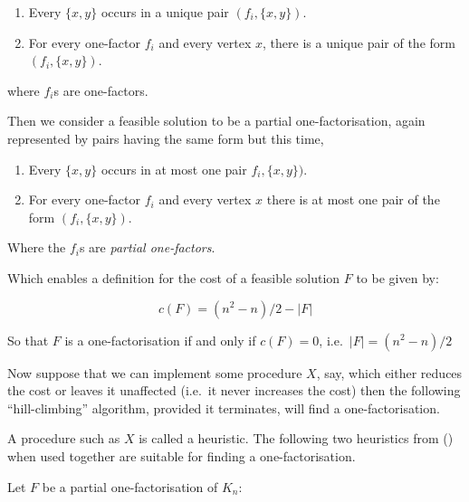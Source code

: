 \documentclass[
  11pt,
  a4paper]{book}
\begin{document}
\begin{enumerate}
\def\labelenumi{\arabic{enumi}.}
\item
  Every \(\{x, y\}\) occurs in a unique pair \((f_i, \{x, y\})\).
\item
  For every one-factor \(f_i\) and every vertex \(x\), there is a unique
  pair of the form \((f_i, \{x, y\})\).
\end{enumerate}

where \(f_i\)s are one-factors.

Then we consider a feasible solution to be a partial one-factorisation,
again represented by pairs having the same form but this time,

\begin{enumerate}
\def\labelenumi{\arabic{enumi}.}
\item
  Every \(\{x, y\}\) occurs in at most one pair \(f_i, \{x, y\})\).
\item
  For every one-factor \(f_i\) and every vertex \(x\) there is at most
  one pair of the form \((f_i, \{x, y\})\).
\end{enumerate}

Where the \(f_i\)s are \emph{partial one-factors}.

Which enables a definition for the cost of a feasible solution \(F\) to
be given by:

\[c(F) = (n^2 - n)/2 - |F|\]

So that \(F\) is a one-factorisation if and only if \(c(F) = 0\),
i.e.~\(|F| = (n^2 - n)/2\)

Now suppose that we can implement some procedure \(X\), say, which
either reduces the cost or leaves it unaffected (i.e.~it never increases
the cost) then the following ``hill-climbing'' algorithm, provided it
terminates, will find a one-factorisation.

\begin{algorithm}[H]
\end{algorithm}

A procedure such as \(X\) is called a heuristic. The following two
heuristics from (\textcite{dinitz_hill-climbing_1987}) when used
together are suitable for finding a one-factorisation.

Let \(F\) be a partial one-factorisation of \(K_n\):

\begin{algorithm}[H]
\caption{$H_1$}
\end{algorithm}
\end{document}
